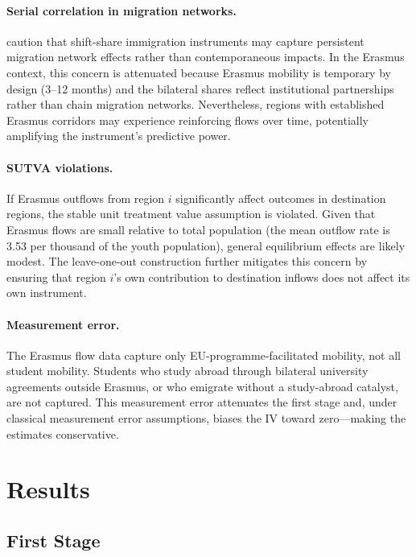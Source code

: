 \documentclass[12pt]{article}
\begin{document}
\paragraph{Serial correlation in migration networks.} \citet{jaeger_ruist_stuhler_2024} caution that shift-share immigration instruments may capture persistent migration network effects rather than contemporaneous impacts. In the Erasmus context, this concern is attenuated because Erasmus mobility is temporary by design (3--12 months) and the bilateral shares reflect institutional partnerships rather than chain migration networks. Nevertheless, regions with established Erasmus corridors may experience reinforcing flows over time, potentially amplifying the instrument's predictive power.

\paragraph{SUTVA violations.} If Erasmus outflows from region $i$ significantly affect outcomes in destination regions, the stable unit treatment value assumption is violated. Given that Erasmus flows are small relative to total population (the mean outflow rate is 3.53 per thousand of the youth population), general equilibrium effects are likely modest. The leave-one-out construction further mitigates this concern by ensuring that region $i$'s own contribution to destination inflows does not affect its own instrument.

\paragraph{Measurement error.} The Erasmus flow data capture only EU-programme-facilitated mobility, not all student mobility. Students who study abroad through bilateral university agreements outside Erasmus, or who emigrate without a study-abroad catalyst, are not captured. This measurement error attenuates the first stage and, under classical measurement error assumptions, biases the IV toward zero---making the estimates conservative.


\section{Results}
\label{sec:results}

\subsection{First Stage}
\label{sec:first_stage}
\end{document}
